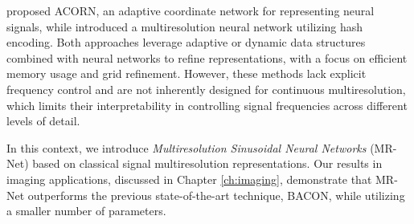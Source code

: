 

\citet{martel2021acorn} proposed ACORN, an adaptive coordinate network for representing neural signals, while \citet{mueller2022instant} introduced a multiresolution neural network utilizing hash encoding. Both approaches leverage adaptive or dynamic data structures combined with neural networks to refine representations, with a focus on efficient memory usage and grid refinement. However, these methods lack explicit frequency control and are not inherently designed for continuous multiresolution, which limits their interpretability in controlling signal frequencies across different levels of detail.

In this context, we introduce \textit{Multiresolution Sinusoidal Neural Networks} (MR-Net) \citep{paz2022,paz2023mr} based on classical signal multiresolution representations. Our results in imaging applications, discussed in Chapter \ref{ch:imaging}, demonstrate that MR-Net outperforms the previous state-of-the-art technique, BACON, while utilizing a smaller number of parameters.





